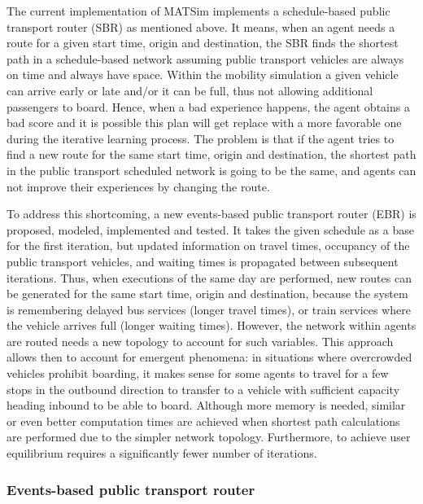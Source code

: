 The current implementation of MATSim implements a schedule-based public transport router (SBR) as mentioned above. It means, when an agent needs a route for a given start time, origin and destination, the SBR finds the shortest path in a schedule-based network assuming public transport vehicles are always on time and always have space. Within the mobility simulation a given vehicle can arrive early or late and/or it can be full, thus not allowing additional passengers to board. Hence, when a bad experience happens, the agent obtains a bad score and it is possible this plan will get replace with a more favorable one during the iterative learning process. The problem is that if the agent tries to find a new route for the same start time, origin and destination, the shortest path in the public transport scheduled network is going to be the same, and agents can not improve their experiences by changing the route.

To address this shortcoming, a new events-based public transport router (EBR) is proposed, modeled, implemented and tested. It takes the given schedule as a base for the first iteration, but updated information on travel times, occupancy of the public transport vehicles, and waiting times is propagated between subsequent iterations. Thus, when executions of the same day are performed, new routes can be generated for the same start time, origin and destination, because the system is remembering delayed bus services (longer travel times), or train services where the vehicle arrives full (longer waiting times). However, the network within agents are routed needs a new topology to account for such variables. This approach allows then to account for  emergent phenomena: in situations where overcrowded vehicles prohibit boarding, it makes sense for some agents to travel for a few stops in the outbound direction to transfer to a vehicle with sufficient capacity heading inbound to be able to board. Although more memory is needed, similar or even better computation times are achieved when shortest path calculations are performed due to the simpler network topology. Furthermore, to achieve user equilibrium requires a significantly fewer number of iterations.

\subsubsection{Events-based public transport router} \label{sec:RouterStructure}

